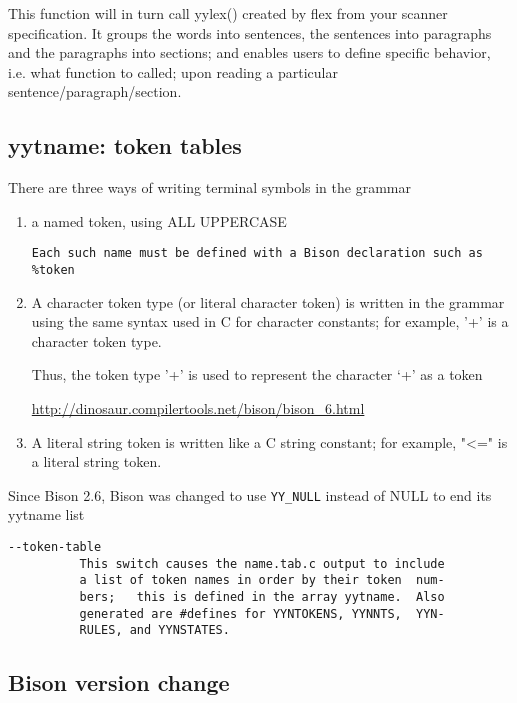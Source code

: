 This function will in turn call yylex() created by flex from your scanner
specification. It groups the words into sentences, the sentences into paragraphs
and the paragraphs into sections; and enables users to define specific behavior,
i.e. what function to called; upon reading a particular 
sentence/paragraph/section.


\subsection{yytname: token tables}

There are three ways of writing terminal symbols in the grammar
\begin{enumerate}
  \item a named token, using ALL UPPERCASE
  
\begin{verbatim}
Each such name must be defined with a Bison declaration such as %token
\end{verbatim}
  
  \item A character token type (or literal character token) is written in the
  grammar using the same syntax used in C for character constants; for example,
  '+' is a character token type.
  
  Thus, the token type '+' is used to represent the character `+' as a token
  
  \url{http://dinosaur.compilertools.net/bison/bison_6.html}
  
  \item A literal string token is written like a C string constant; for example, "<=" is a literal string token.
  
\end{enumerate}

Since Bison 2.6, Bison was  changed to use \verb!YY_NULL! instead of NULL to end
its yytname list


\begin{verbatim}
--token-table
	      This switch causes the name.tab.c output to include
	      a list of token names in order by their token  num-
	      bers;   this is defined in the array yytname.  Also
	      generated are #defines for YYNTOKENS, YYNNTS,  YYN-
	      RULES, and YYNSTATES.
\end{verbatim}

\subsection{Bison version change}

